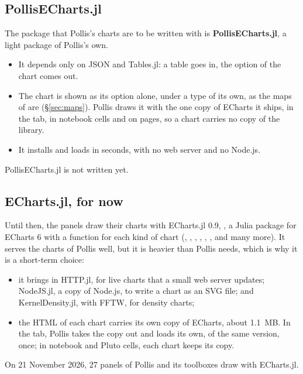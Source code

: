 \subsection{PollisECharts.jl}
The package that Pollis's charts are to be written with is \textbf{PollisECharts.jl}, a light package of Pollis's
own.
\begin{itemize}
  \item It depends only on JSON and Tables.jl: a table goes in, the option of the chart comes out.
  \item The chart is shown as its option alone, under a type of its own, as the maps of  are
    (\S\ref{sec:maps}). Pollis draws it with the one copy of ECharts it ships, in the  tab, in notebook cells
    and on pages, so a chart carries no copy of the library.
  \item It installs and loads in seconds, with no web server and no Node.js.
\end{itemize}
PollisECharts.jl is not written yet.

\subsection{ECharts.jl, for now}
Until then, the panels draw their charts with ECharts.jl 0.9, , a Julia package for
ECharts 6 with a function for each kind of chart (, , , ,
, ,  and many more). It serves the charts of Pollis well, but it is
heavier than Pollis needs, which is why it is a short-term choice:
\begin{itemize}
  \item it brings in HTTP.jl, for live charts that a small web server updates; NodeJS.jl, a copy of Node.js, to write
    a chart as an SVG file; and KernelDensity.jl, with FFTW, for density charts;
  \item the HTML of each chart carries its own copy of ECharts, about 1.1~MB. In the  tab, Pollis takes the
    copy out and loads its own, of the same version, once; in notebook and Pluto cells, each chart keeps its copy.
\end{itemize}
On 21 November 2026, 27 panels of Pollis and its toolboxes draw with ECharts.jl.

